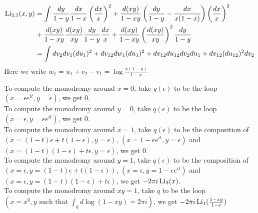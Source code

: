 \documentclass[main]{subfiles}
\begin{document}
\begin{align*}
\operatorname{Li}_{3,1}(x,y)&=\int\frac{dy}{1-y}\frac{dx}{1-x}\left(\frac{dx}{x}\right)^2+\frac{d(xy)}{1-xy}\left(\frac{dy}{1-y}-\frac{dx}{x(1-x)}\right)\left(\frac{dx}{x}\right)^2 \\
&+\frac{d(xy)}{1-xy}\frac{d(xy)}{xy}\frac{dy}{1-y}\frac{dx}{x}+\frac{d(xy)}{1-xy}\left(\frac{d(xy)}{xy}\right)^2\frac{dy}{1-y} \\
&=\int dv_2dv_1(du_1)^2+dv_{12}dw_1(du_1)^2 +dv_{12}du_{12}dv_2du_1+dv_{12}(du_{12})^2dv_2
\end{align*}
Here we write $w_{1}=u_1+v_2-v_1=\log\frac{x(1-y)}{1-x}$

To compute the monodromy around $x=0$, take $q(\epsilon)$ to be the loop $(x=\epsilon e^{it},y=\epsilon)$, we get $0$. \\
To compute the monodromy around $y=0$, take $q(\epsilon)$ to be the loop $(x=\epsilon,y=\epsilon e^{it})$, we get $0$. \\
To compute the monodromy around $x=1$, take $q(\epsilon)$ to be the composition of $(x=(1-t)\epsilon+t(1-\epsilon),y=\epsilon)$, $(x=1-\epsilon e^{it},y=\epsilon)$ and $(x=(1-t)(1-\epsilon)+t\epsilon,y=\epsilon)$, we get $0$. \\
To compute the monodromy around $y=1$, take $q(\epsilon)$ to be the composition of $(x=\epsilon,y=(1-t)\epsilon+t(1-\epsilon))$, $(x=\epsilon,y=1-\epsilon e^{it})$ and $(x=\epsilon,y=(1-t)(1-\epsilon)+t\epsilon)$, we get $-2\pi i\operatorname{Li}_3(x)$. \\
To compute the monodromy around $xy=1$, take $q$ to be the loop $(x=x^0,y\text{ such that }\int_qd\log(1-xy)=2\pi i)$, we get $-2\pi i\operatorname{Li}_1(\frac{1-xy}{1-x})$
\end{document}
